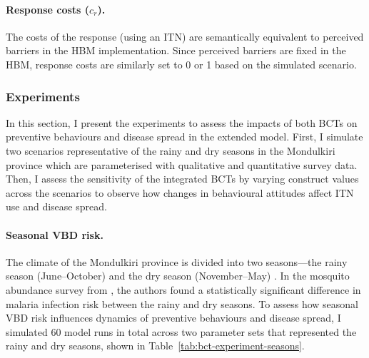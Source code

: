 \paragraph{Response costs ($c_r$).}The costs of the response (using an ITN) are semantically equivalent to perceived barriers in the HBM implementation. Since perceived barriers are fixed in the HBM, response costs are similarly set to 0 or 1 based on the simulated scenario.


\subsubsection{Experiments}\label{sec:bcts-experiments}

In this section, I present the experiments to assess the impacts of both BCTs on preventive behaviours and disease spread in the extended model. First, I simulate two scenarios representative of the rainy and dry seasons in the Mondulkiri province which are parameterised with qualitative and quantitative survey data. Then, I assess the sensitivity of the integrated BCTs by varying construct values across the scenarios to observe how changes in behavioural attitudes affect ITN use and disease spread.

\paragraph{Seasonal VBD risk.}The climate of the Mondulkiri province is divided into two seasons---the rainy season (June--October) and the dry season (November--May) \cite{pepey_mobility_2022}. In the mosquito abundance survey from \citet{vantaux_anopheles_2021}, the authors found a statistically significant difference in malaria infection risk between the rainy and dry seasons. To assess how seasonal VBD risk influences dynamics of preventive behaviours and disease spread, I simulated 60 model runs in total across two parameter sets that represented the rainy and dry seasons, shown in Table~\ref{tab:bct-experiment-seasons}.

